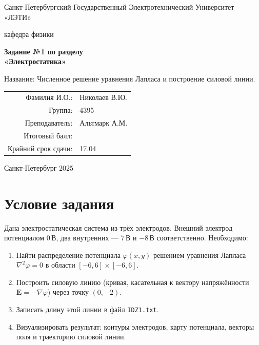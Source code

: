 \documentclass[12pt]{article}
\begin{document}
\begin{titlepage}
\centering
{\large Санкт-Петербургский Государственный Электротехнический Университет «ЛЭТИ»\par}
\vspace{1.5cm}
{\large кафедра физики\par}
\vspace{3cm}
{\LARGE \textbf{Задание №1 по разделу \\ «Электростатика»}\par}
\vspace{1cm}
{\Large Название: Численное решение уравнения Лапласа и построение силовой линии.\par}
\vspace{3cm}
\begin{flushright}
    \begin{tabular}{@{}r@{\quad}l@{}}
        Фамилия И.О.: & Николаев В.Ю.\\[0.5cm]
        Группа:        & 4395\\[0.5cm]
        Преподаватель: & Альтмарк А.М.\\[0.5cm]
        Итоговый балл: & \\[0.5cm]
        Крайний срок сдачи: & 17.04\\[0.5cm]
    \end{tabular}
\end{flushright}
\vfill
{\Large Санкт-Петербург 2025\par}
\end{titlepage}

\section*{Условие задания}
Дана электростатическая система из трёх электродов. Внешний электрод потенциалом \(0\,\text{В}\), два внутренних — \(7\,\text{В}\) и \(-8\,\text{В}\) соответственно. Необходимо:
\begin{enumerate}
    \item Найти распределение потенциала \(\varphi(x,y)\) решением уравнения Лапласа \(\nabla^2\varphi=0\) в области \([-6,6]\times[-6,6]\).
    \item Построить силовую линию (кривая, касательная к вектору напряжённости \(\mathbf E=-\nabla\varphi\)) через точку \((0,-2)\).
    \item Записать длину этой линии в файл \texttt{IDZ1.txt}.
    \item Визуализировать результат: контуры электродов, карту потенциала, векторы поля и траекторию силовой линии.
\end{enumerate}
\end{document}
